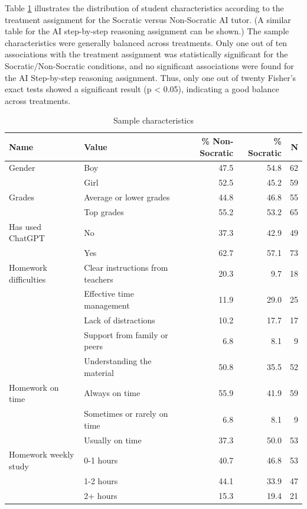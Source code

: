 \documentclass[
  11pt,
]{article}
\begin{document}
Table \ref{tab:summary-statistics} illustrates the distribution of student characteristics according to the treatment assignment for the Socratic versus Non-Socratic AI tutor. (A similar table for the AI step-by-step reasoning assignment can be shown.) The sample characteristics were generally balanced across treatments. Only one out of ten associations with the treatment assignment was statistically significant for the Socratic/Non-Socratic conditions, and no significant associations were found for the AI Step-by-step reasoning assignment. Thus, only one out of twenty Fisher's exact tests showed a significant result (p \textless{} 0.05), indicating a good balance across treatments.

\begin{table}
\centering
\caption{\label{tab:summary-statistics}Sample characteristics}
\centering
\begin{tabular}[t]{llrrr}
\toprule
Name & Value & \% Non-Socratic & \% Socratic & N\\
\midrule\arrayrulecolor{gray!20}
Gender & Boy & 47.5 & 54.8 & 62\\
\hline
 & Girl & 52.5 & 45.2 & 59\\
\hline
Grades & Average or lower grades & 44.8 & 46.8 & 55\\
\hline
 & Top grades & 55.2 & 53.2 & 65\\
\hline
Has used ChatGPT & No & 37.3 & 42.9 & 49\\
\hline
 & Yes & 62.7 & 57.1 & 73\\
\hline
Homework difficulties & Clear instructions from teachers & 20.3 & 9.7 & 18\\
\hline
 & Effective time management & 11.9 & 29.0 & 25\\
\hline
 & Lack of distractions & 10.2 & 17.7 & 17\\
\hline
 & Support from family or peers & 6.8 & 8.1 & 9\\
\hline
 & Understanding the material & 50.8 & 35.5 & 52\\
\hline
Homework on time & Always on time & 55.9 & 41.9 & 59\\
\hline
 & Sometimes or rarely on time & 6.8 & 8.1 & 9\\
\hline
 & Usually on time & 37.3 & 50.0 & 53\\
\hline
Homework weekly study & 0-1 hours & 40.7 & 46.8 & 53\\
\hline
 & 1-2 hours & 44.1 & 33.9 & 47\\
\hline
 & 2+ hours & 15.3 & 19.4 & 21\\

\end{tabular}
\end{table}
\end{document}
